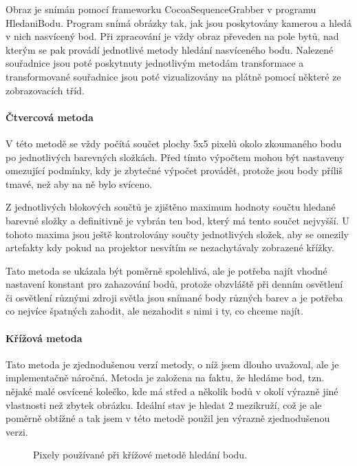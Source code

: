 \documentclass[twoside,12pt]{article}
\newcommand{\podpodsekce}[1]{\paragraph{#1}\quad\vskip 6pt}
\begin{document}
Obraz je snímán pomocí frameworku CocoaSequenceGrabber v programu HledaniBodu. Program snímá obrázky tak, jak jsou poskytovány kamerou a hledá v nich nasvícený bod. Při zpracování je vždy obraz převeden na pole bytů, nad kterým se pak provádí jednotlivé metody hledání nasvíceného bodu. Nalezené souřadnice jsou poté poskytnuty jednotlivým metodám transformace a transformované souřadnice jsou poté vizualizovány na plátně pomocí některé ze zobrazovacích tříd.

\podpodsekce{Čtvercová metoda}

V této metodě se vždy počítá součet plochy 5x5 pixelů okolo zkoumaného bodu po jednotlivých barevných složkách. Před tímto výpočtem mohou být nastaveny omezující podmínky, kdy je zbytečné výpočet provádět, protože jsou body příliš tmavé, než aby na ně bylo svíceno. 

Z jednotlivých blokových součtů je zjištěno maximum hodnoty součtu hledané barevné složky a definitivně je vybrán ten bod, který má tento součet nejvyšší. U tohoto maxima jsou ještě kontrolovány součty jednotlivých složek, aby se omezily artefakty kdy pokud na projektor nesvítím se nezachytávaly zobrazené křížky.

Tato metoda se ukázala být poměrně spolehlivá, ale je potřeba najít vhodné nastavení konstant pro zahazování bodů, protože obzvláště při denním osvětlení či osvětlení různými zdroji světla  jsou snímané body různých barev a je potřeba co nejvíce špatných zahodit, ale nezahodit s nimi i ty, co chceme najít.

\podpodsekce{Křížová metoda}

Tato metoda je zjednodušenou verzí metody, o níž jsem dlouho uvažoval, ale je implementačně náročná. Metoda je založena na faktu, že hledáme bod, tzn. nějaké malé osvícené kolečko, kde má střed a několik bodů v okolí výrazně jiné vlastnosti než zbytek obrázku. Ideální stav je hledat 2 mezikruží, což je ale poměrně obtížné a tak jsem v této metodě použil jen výrazně zjednodušenou verzi.

\begin{figure}[ht]
 \begin{center}
 \end{center}
 \caption{Pixely používané při křížové metodě hledání bodu.}
\end{figure}
\end{document}
